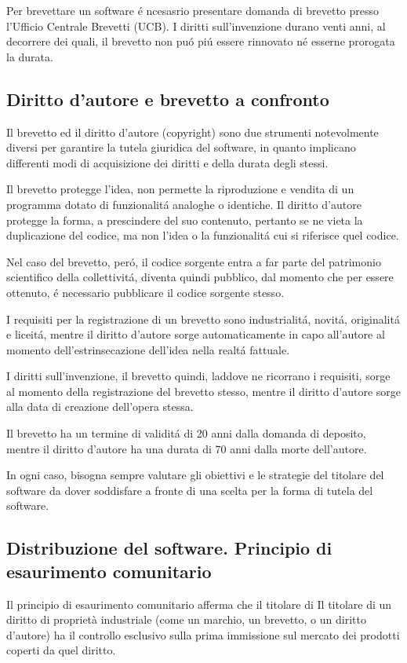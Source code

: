 \documentclass{article}
\begin{document}
Per brevettare un software \'e ncesasrio presentare domanda di brevetto presso l'Ufficio Centrale Brevetti (UCB). I diritti sull'invenzione durano venti anni, al decorrere dei quali, il brevetto non pu\'o pi\'u essere rinnovato n\'e esserne prorogata la durata.

\subsection{Diritto d'autore e brevetto a confronto}
Il brevetto ed il diritto d'autore (copyright) sono due strumenti notevolmente diversi per garantire la tutela giuridica del software, in quanto implicano differenti modi di acquisizione dei diritti e della durata degli stessi. 

Il brevetto protegge l'idea, non permette la riproduzione e vendita di un programma dotato di funzionalit\'a  analoghe o identiche. Il diritto d'autore protegge la forma, a prescindere del suo contenuto, pertanto se ne vieta la duplicazione del codice, ma non l'idea o la funzionalit\'a cui si riferisce quel codice.

Nel caso del brevetto, per\'o, il codice sorgente entra a far parte del patrimonio scientifico della collettivit\'a, diventa quindi pubblico, dal momento che per essere ottenuto, \'e necessario pubblicare il codice sorgente stesso. 

I requisiti per la registrazione di un brevetto sono industrialit\'a, novit\'a, originalit\'a e liceit\'a, mentre il diritto d'autore sorge automaticamente in capo all'autore al momento dell'estrinsecazione dell'idea nella realt\'a fattuale.

I diritti sull'invenzione, il brevetto quindi, laddove ne ricorrano i requisiti, sorge al momento della registrazione del brevetto stesso, mentre il diritto d'autore sorge alla data di creazione dell'opera stessa.

Il brevetto ha un termine di validit\'a di 20 anni dalla domanda di deposito, mentre il diritto d'autore ha una durata di 70 anni dalla morte dell'autore.

In ogni caso, bisogna sempre valutare gli obiettivi e le strategie del titolare del software da dover soddisfare a fronte di una scelta per la forma di tutela del software. 

\subsection{Distribuzione del software. Principio di esaurimento comunitario}
Il principio di esaurimento comunitario afferma che il titolare di Il titolare di un diritto di proprietà industriale (come un marchio, un brevetto, o un diritto d’autore) ha il controllo esclusivo sulla prima immissione sul mercato dei prodotti coperti da quel diritto.
\end{document}
